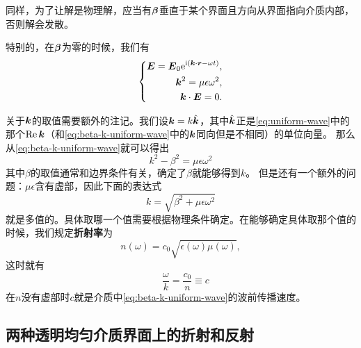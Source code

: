 \documentclass[UTF8, a4paper]{ctexart}
\newcommand*{\ii}{\mathrm{i}}
\newcommand*{\ee}{\mathrm{e}}
\begin{document}
同样，为了让解是物理解，应当有$\vb*{\beta}$垂直于某个界面且方向从界面指向介质内部，否则解会发散。

特别的，在$\vb*{\beta}$为零的时候，我们有
\begin{equation}
    \left\{
        \begin{aligned}
            \vb*{E} = \vb*{E}_0 \ee^{\ii(\vb*{k} \cdot \vb*{r} - \omega t)}, \\
            \vb*{k}^2 = \mu\epsilon \omega^2, \\
            \vb*{k} \cdot \vb*{E} = 0.
        \end{aligned}
    \right.
    \label{eq:beta-zero-uniform-wave}
\end{equation}

关于$\vb*{k}$的取值需要额外的注记。我们设$\vb*{k}=k \hat{\vb*{k}}$，其中$\hat{\vb*{k}}$正是\eqref{eq:uniform-wave}中的那个$\Re\vb*{k}$（和\eqref{eq:beta-k-uniform-wave}中的$\vb*{k}$同向但是不相同）的单位向量。
那么从\eqref{eq:beta-k-uniform-wave}就可以得出
\begin{equation}
    k^2 - \beta^2 = \mu \epsilon \omega^2
\end{equation}
其中$\beta$的取值通常和边界条件有关，确定了$\beta$就能够得到$k$。
但是还有一个额外的问题：$\mu \epsilon$含有虚部，因此下面的表达式
\[
    k = \sqrt{\beta^2 + \mu \epsilon \omega^2}
\]
就是多值的。具体取哪一个值需要根据物理条件确定。在能够确定具体取那个值的时候，我们规定\textbf{折射率}为
\begin{equation}
    n(\omega) = c_0 \sqrt{\epsilon(\omega) \mu(\omega)}, 
    \label{eq:refractivity}
\end{equation}
这时就有
\begin{equation}
    \quad \frac{\omega}{k} = \frac{c_0}{n} \equiv c
    \label{eq:k-and-omega-and-n}
\end{equation}
在$n$没有虚部时$c$就是介质中\eqref{eq:beta-k-uniform-wave}的波前传播速度。

\subsection{两种透明均匀介质界面上的折射和反射}\label{sec:two-isotrophy-surface}
\end{document}
